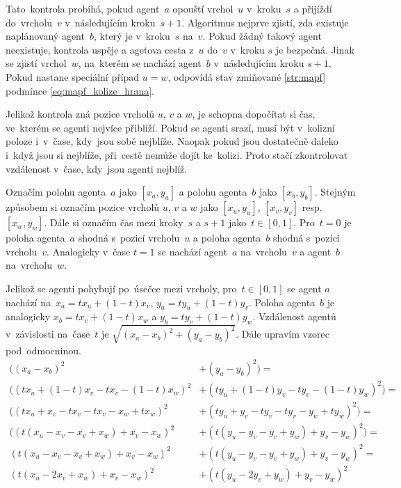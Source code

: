 Tato~kontrola probíhá, pokud agent~$a$ opouští vrchol~$u$ v~kroku~$s$ a přijíždí do~vrcholu~$v$ v~následujícím kroku~$s + 1$.
Algoritmus nejprve zjistí, zda existuje naplánovaný agent~$b$, který je v~kroku~$s$ na~$v$.
Pokud žádný takový agent neexistuje, kontrola uspěje a agetova cesta z~$u$ do~$v$ v~kroku $s$ je bezpečná.
Jinak se zjistí vrchol~$w$, na~kterém se nachází agent~$b$ v~následujícím kroku $s + 1$.
Pokud nastane speciální případ $u=w$, odpovídá stav zmiňované \ref{str:mapf} podmínce \eqref{eq:mapf_kolize_hrana}.

Jelikož kontrola zná pozice vrcholů $u$, $v$ a $w$, je schopna dopočítat si čas, ve~kterém se agenti nejvíce přiblíží.
Pokud se agenti srazí, musí být v~kolizní poloze i~v~čase, kdy~jsou sobě nejblíže.
Naopak pokud jsou dostatečně daleko i~když jsou si nejblíže, při~cestě nemůže dojít ke~kolizi.
Proto stačí zkontrolovat vzdálenost v~čase, kdy~jsou agenti nejblíž.

Označím polohu agenta~$a$ jako $[x_a, y_a]$ a polohu agenta~$b$ jako $[x_b, y_b]$.
Stejným způsobem si označím pozice vrcholů $u$, $v$ a $w$ jako $[x_u, y_u]$, $[x_v, y_v]$ resp. $[x_w, y_w]$.
Dále si označím čas mezi kroky~$s$ a $s + 1$ jako~$t\in[0, 1]$.
Pro~$t = 0$ je poloha agenta~$a$ shodná s~pozicí vrcholu~$u$ a poloha agenta~$b$ shodná s~pozicí vrcholu~$v$.
Analogicky v~čase $t = 1$ se nachází agent~$a$ na~vrcholu~$v$ a agent~$b$ na~vrcholu~$w$.

Jelikož se agenti pohybují po~úsečce mezi vrcholy,
pro~$t\in[0, 1]$ se agent $a$ nachází na~$x_a = tx_u + (1 - t)x_v$, $y_a = ty_u + (1 - t)y_v$.
Poloha agenta~$b$ je analogicky $x_b = tx_v + (1 - t)x_w$ a $y_b = ty_v + (1 - t)y_w$.
Vzdálenost agentů v~závislosti na~čase~$t$ je $\sqrt{(x_a - x_b)^2 + (y_a - y_b)^2}$.
Dále upravím vzorec pod~odmocninou.
\begin{align*}
	((x_a - x_b)^2 &+ (y_a - y_b)^2) = \\
	((tx_u + (1 - t)x_v - tx_v - (1 - t)x_w)^2 &+ (ty_u + (1 - t)y_v - ty_v - (1 - t)y_w)^2) = \\
	((tx_u + x_v - tx_v - tx_v - x_w + tx_w)^2 &+ (ty_u + y_v - ty_v - ty_v - y_w + ty_w)^2) = \\
	((t(x_u - x_v - x_v + x_w) + x_v - x_w)^2 &+ (t(y_u - y_v - y_v + y_w) + y_v - y_w)^2) = \\
	(t(x_u - x_v - x_v + x_w) + x_v - x_w)^2 &+ (t(y_u - y_v - y_v + y_w) + y_v - y_w)^2 = \\
	(t(x_u - 2x_v + x_w) + x_v - x_w)^2 &+ (t(y_u - 2y_v + y_w) + y_v - y_w)^2 \\
\end{align*}


